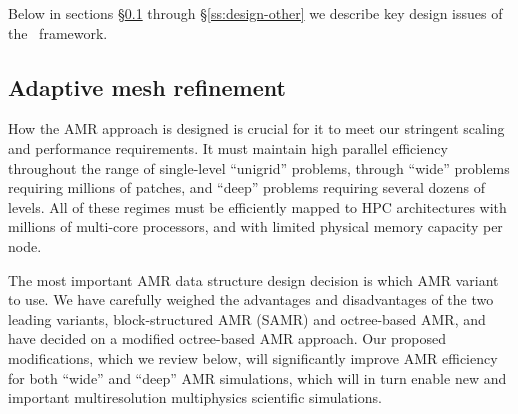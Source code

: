 \documentclass[11pt,letterpaper]{article}
\begin{document}
Below in sections \S\ref{ss:design-amr} through
\S\ref{ss:design-other} we describe key design issues of the \cello\
framework.

\subsection{Adaptive mesh refinement} \label{ss:design-amr}

How the AMR approach is designed is crucial for it to meet our
stringent scaling and performance requirements.  It must maintain high
parallel efficiency throughout the range of single-level ``unigrid''
problems, through ``wide'' problems requiring millions of patches, and
``deep'' problems requiring several dozens of levels.  All of these
regimes must be efficiently mapped to HPC architectures with millions
of multi-core processors, and with limited physical memory capacity
per node.

The most important AMR data structure design decision is which AMR
variant to use.  We have carefully weighed the advantages and
disadvantages of the two leading variants, block-structured AMR (SAMR)
and octree-based AMR, and have decided on a modified octree-based AMR
approach.  Our proposed modifications, which we review below, will
significantly improve AMR efficiency for both ``wide'' and ``deep''
AMR simulations, which will in turn enable new and important
multiresolution multiphysics scientific simulations.

\end{document}
